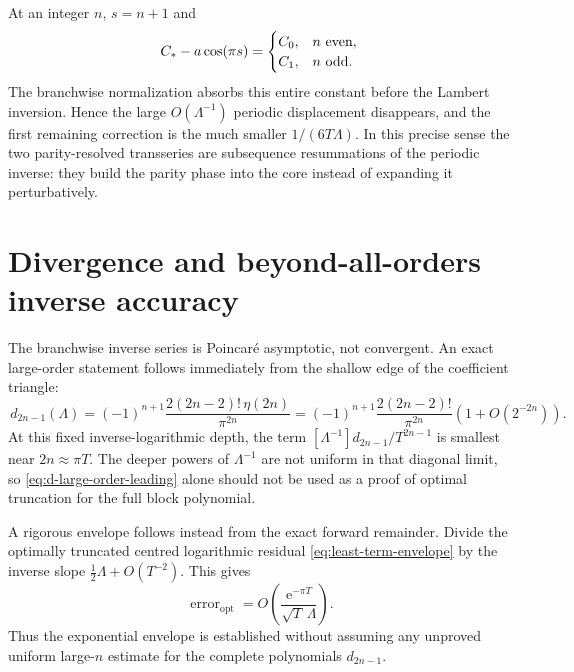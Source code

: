 \documentclass[11pt,a4paper,oneside]{article}
\theoremstyle{plain}
\theoremstyle{definition}
\theoremstyle{remark}
\newcommand{\e}{\mathrm e}
\newcommand{\etaD}{\eta}
\begin{document}
At an integer $n$, $s=n+1$ and
\begin{equation}
 C_*-a\cos(\pi s)=
 \begin{cases}
 C_0,&n\ \hbox{even},\\
 C_1,&n\ \hbox{odd}.
 \end{cases}
 \label{eq:periodic-freeze}
\end{equation}
The branchwise normalization absorbs this entire constant before the Lambert
inversion.  Hence the large $O(\Lambda^{-1})$ periodic displacement disappears,
and the first remaining correction is the much smaller
$1/(6T\Lambda)$.  In this precise sense the two parity-resolved transseries are
subsequence resummations of the periodic inverse: they build the parity phase
into the core instead of expanding it perturbatively.

\section{Divergence and beyond-all-orders inverse accuracy}
\label{sec:inverse-large-order}

The branchwise inverse series is Poincar\'e asymptotic, not convergent.  An
exact large-order statement follows immediately from the shallow edge of the
coefficient triangle:
\begin{equation}
 [\Lambda^{-1}]\,d_{2n-1}(\Lambda)
 =(-1)^{n+1}\frac{2(2n-2)!\,\etaD(2n)}{\pi^{2n}}
 =(-1)^{n+1}\frac{2(2n-2)!}{\pi^{2n}}
 \left(1+O(2^{-2n})\right).
 \label{eq:d-large-order-leading}
\end{equation}
At this fixed inverse-logarithmic depth, the term
$[\Lambda^{-1}]d_{2n-1}/T^{2n-1}$ is smallest near
$2n\approx\pi T$.  The deeper powers of $\Lambda^{-1}$ are not uniform in
that diagonal limit, so \cref{eq:d-large-order-leading} alone should not be
used as a proof of optimal truncation for the full block polynomial.

A rigorous envelope follows instead from the exact forward remainder.  Divide
the optimally truncated centred logarithmic residual
\cref{eq:least-term-envelope} by the inverse slope
$\tfrac12\Lambda+O(T^{-2})$.  This gives
\begin{equation}
 \operatorname{error}_{\mathrm{opt}}
 =O\!\left(\frac{\e^{-\pi T}}{\sqrt T\,\Lambda}\right).
 \label{eq:inverse-optimal-envelope}
\end{equation}
Thus the exponential envelope is established without assuming any unproved
uniform large-$n$ estimate for the complete polynomials $d_{2n-1}$.
\end{document}
